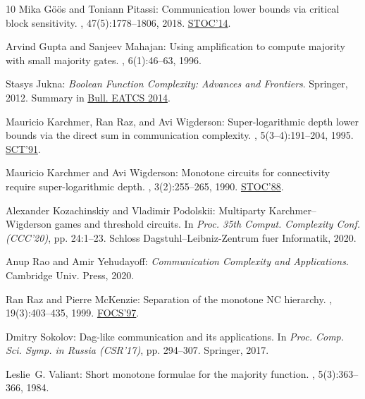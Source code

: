 \begin{thebibliography}{10}
{\sc Mika G{\"o}{\"o}s and Toniann Pitassi}: Communication lower bounds via
  critical block sensitivity.
, 47(5):1778--1806, 2018.
\newblock \prelim \href{https://doi.org/10.1145/2591796.2591838}{STOC'14}.
\newblock [\epfmtdoi{10.1137/16M1082007}]

{\sc Arvind Gupta and Sanjeev Mahajan}: Using amplification to compute majority
  with small majority gates.
, 6(1):46--63, 1996.
\newblock [\epfmtdoi{10.1007/BF01202041}]

{\sc Stasys Jukna}: {\em Boolean Function Complexity: Advances and Frontiers}.
\newblock Springer, 2012.
\newblock Summary in
  \href{http://eatcs.org/beatcs/index.php/beatcs/article/view/275}{Bull. EATCS
  2014}.
\newblock [\epfmtdoi{10.1007/978-3-642-24508-4}]

{\sc Mauricio Karchmer, Ran Raz, and Avi Wigderson}: Super-logarithmic depth
  lower bounds via the direct sum in communication complexity.
, 5(3--4):191--204, 1995.
\newblock \prelim \href{https://doi.org/10.1109/SCT.1991.160273}{SCT'91}.
\newblock [\epfmtdoi{10.1007/BF01206317}]

{\sc Mauricio Karchmer and Avi Wigderson}: Monotone circuits for connectivity
  require super-logarithmic depth.
, 3(2):255--265, 1990.
\newblock \prelim \href{https://doi.org/10.1145/62212.62265}{STOC'88}.
\newblock [\epfmtdoi{10.1137/0403021}]

{\sc Alexander Kozachinskiy and Vladimir Podolskii}: Multiparty
  {K}archmer--{W}igderson games and threshold circuits.
\newblock In {\em Proc. 35th Comput. Complexity Conf. (CCC'20)}, pp. 24:1--23.
  Schloss Dagstuhl--Leibniz-Zentrum fuer Informatik, 2020.

{\sc Anup Rao and Amir Yehudayoff}: {\em Communication Complexity and
  Applications}.
\newblock Cambridge Univ. Press, 2020.
\newblock [\epfmtdoi{10.1017/9781108671644}]

{\sc Ran Raz and Pierre McKenzie}: Separation of the monotone {NC} hierarchy.
, 19(3):403--435, 1999.
\newblock \prelim \href{https://doi.org/10.1109/SFCS.1997.646112}{FOCS'97}.
\newblock [\epfmtdoi{10.1007/s004930050062}]

{\sc Dmitry Sokolov}: Dag-like communication and its applications.
\newblock In {\em Proc. Comp. Sci. Symp. in Russia (CSR'17)}, pp. 294--307.
  Springer, 2017.

{\sc Leslie~G. Valiant}: Short monotone formulae for the majority function.
, 5(3):363--366, 1984.
\newblock [\epfmtdoi{10.1016/0196-6774(84)90016-6}]

\end{thebibliography}